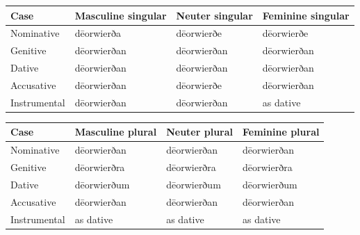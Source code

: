 \par\begingroup
\fontsize{10.5}{13.2}\selectfont
\setlength{\LTleft}{0pt}\setlength{\LTright}{\fill}
\noindent
\begin{tabular}{@{}>{\raggedright\arraybackslash}p{22.0mm}>{\raggedright\arraybackslash}p{31.188mm}>{\raggedright\arraybackslash}p{31.188mm}>{\raggedright\arraybackslash}p{31.188mm}@{}}
\toprule
\textbf{Case} & \textbf{Masculine singular} & \textbf{Neuter singular} & \textbf{Feminine singular} \\
\midrule
Nominative & dēorwierða & dēorwierðe & dēorwierðe \\
Genitive & dēorwierðan & dēorwierðan & dēorwierðan \\
Dative & dēorwierðan & dēorwierðan & dēorwierðan \\
Accusative & dēorwierðan & dēorwierðe & dēorwierðan \\
Instrumental & dēorwierðan & dēorwierðan & as dative \\
\bottomrule
\end{tabular}
\par\endgroup
\par\addvspace{5pt}
\par\begingroup
\fontsize{10.5}{13.2}\selectfont
\setlength{\LTleft}{0pt}\setlength{\LTright}{\fill}
\noindent
\begin{tabular}{@{}>{\raggedright\arraybackslash}p{22.0mm}>{\raggedright\arraybackslash}p{31.188mm}>{\raggedright\arraybackslash}p{31.188mm}>{\raggedright\arraybackslash}p{31.188mm}@{}}
\toprule
\textbf{Case} & \textbf{Masculine plural} & \textbf{Neuter plural} & \textbf{Feminine plural} \\
\midrule
Nominative & dēorwierðan & dēorwierðan & dēorwierðan \\
Genitive & dēorwierðra & dēorwierðra & dēorwierðra \\
Dative & dēorwierðum & dēorwierðum & dēorwierðum \\
Accusative & dēorwierðan & dēorwierðan & dēorwierðan \\
Instrumental & as dative & as dative & as dative \\
\bottomrule
\end{tabular}
\par\endgroup

